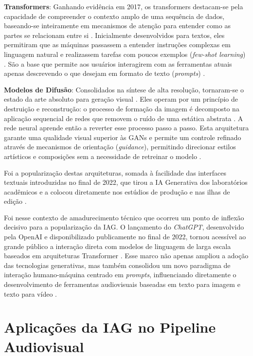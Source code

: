 \textbf{Transformers}: Ganhando evidência em 2017, os transformers destacam-se pela capacidade de compreender o contexto amplo de uma sequência de dados, baseando-se inteiramente em mecanismos de atenção para entender como as partes se relacionam entre si \citep{vaswani2017attention}. Inicialmente desenvolvidos para textos, eles permitiram que as máquinas passassem a entender instruções complexas em linguagem natural e realizassem tarefas com poucos exemplos (\textit{few-shot learning}) \citep{brown2020language}. São a base que permite aos usuários interagirem com as ferramentas atuais apenas descrevendo o que desejam em formato de texto (\textit{prompts}) \citep{floridi2020gpt3}.

\textbf{Modelos de Difusão}: Consolidados na síntese de alta resolução, tornaram-se o estado da arte absoluto para geração visual \citep{dhariwal2021diffusion, rombach2022high}. Eles operam por um princípio de destruição e reconstrução: o processo de formação da imagem é decomposto na aplicação sequencial de redes que removem o ruído de uma estática abstrata \citep{rombach2022high}. A rede neural aprende então a reverter esse processo passo a passo. Esta arquitetura garante uma qualidade visual superior às GANs e permite um controle refinado através de mecanismos de orientação (\textit{guidance}), permitindo direcionar estilos artísticos e composições sem a necessidade de retreinar o modelo \citep{dhariwal2021diffusion}.

Foi a popularização destas arquiteturas, somada à facilidade das interfaces textuais introduzidas no final de 2022, que tirou a IA Generativa dos laboratórios acadêmicos e a colocou diretamente nos estúdios de produção e nas ilhas de edição \citep{dwivedi2023chatgpt}.

Foi nesse contexto de amadurecimento técnico que ocorreu um ponto de inflexão decisivo para a popularização da IAG. O lançamento do \textit{ChatGPT}, desenvolvido pela OpenAI e disponibilizado publicamente no final de 2022, tornou acessível ao grande público a interação direta com modelos de linguagem de larga escala baseados em arquiteturas Transformer \citep{brown2020language}. Esse marco não apenas ampliou a adoção das tecnologias generativas, mas também consolidou um novo paradigma de interação humano-máquina centrado em \textit{prompts}, influenciando diretamente o desenvolvimento de ferramentas audiovisuais baseadas em texto para imagem e texto para vídeo \citep{dwivedi2023chatgpt}.

\section{Aplicações da IAG no Pipeline Audiovisual}


